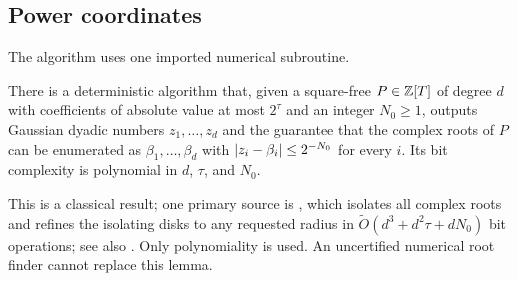 \subsection{Power coordinates}
\label{app:algebraic-power}

The algorithm uses one imported numerical subroutine.

\begin{lemma}
\label{lem:algebraic-roots}
There is a deterministic algorithm that, given a square-free $P\in\mathbb Z[T]$ of
degree $d$ with coefficients of absolute value at most $2^\tau$ and an integer
$N_0\ge1$, outputs Gaussian dyadic numbers $z_1,\ldots,z_d$ and the guarantee
that the complex roots of $P$ can be enumerated as $\beta_1,\ldots,\beta_d$
with $\left\lvert z_i-\beta_i\right\rvert\le2^{-N_0}$ for every $i$. Its bit complexity is
polynomial in $d$, $\tau$, and $N_0$.
\end{lemma}

This is a classical result; one primary source is
\cite[Theorem~5]{MehlhornSagraloffWang2015}, which isolates all complex roots
and refines the isolating disks to any requested radius in
$\widetilde O(d^3+d^2\tau+dN_0)$ bit operations; see also
\cite{Schonhage1982,Pan2002}. Only polynomiality is used. An uncertified
numerical root finder cannot replace this lemma.

